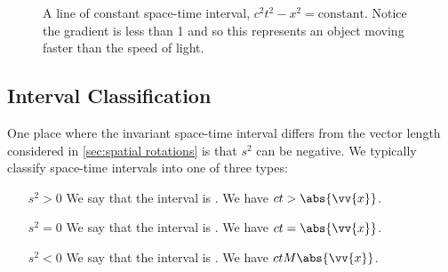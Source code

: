 \documentclass[fleqn]{NotesClass}
\begin{document}
    \begin{figure}
        \caption{A line of constant space-time interval, \(c^2t^2 - x^2 = \text{constant}\). Notice the gradient is less than 1 and so this represents an object moving faster than the speed of light.}
        \label{fig:world line const space time interval}
    \end{figure}

    \subsection{Interval Classification}
    One place where the invariant space-time interval differs from the vector length considered in \cref{sec:spatial rotations} is that \(s^2\) can be negative.
    We typically classify space-time intervals into one of three types:
    \begin{itemize}
        \item[\(s^2 > 0\)] We say that the interval is . We have \(ct > \abs{\vv{x}}\).
        \item[\(s^2 = 0\)] We say that the interval is .
        We have \(ct = \abs{\vv{x}}\).
        \item[\(s^2 < 0\)] We say that the interval is .
        We have \(ct M \abs{\vv{x}}\).
    \end{itemize}
    
\end{document}
